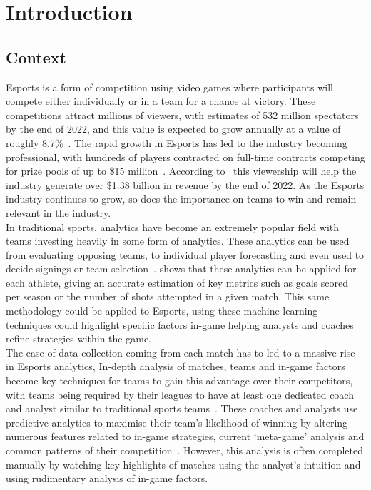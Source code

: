 \chapter{Introduction}\label{ch:introduction}

\section{Context}\label{sec:Context}

\ac{Esports} is a form of competition using video games where participants will compete either individually or in a team for a chance at victory.
These competitions attract millions of viewers, with estimates of 532 million spectators by the end of 2022, and this value is expected to grow annually at a value of roughly 8.7\%~\citep{newzoo2022viewers}.
The rapid growth in \ac{Esports} has led to the industry becoming professional, with hundreds of players contracted on full-time contracts competing for prize pools of up to \$15 million~\citep{esportsearnings}.
According to~\citet{newzoo2022viewers} this viewership will help the industry generate over \$1.38 billion in revenue by the end of 2022.
As the \ac{Esports} industry continues to grow, so does the importance on teams to win and remain relevant in the industry.\\

In traditional sports, analytics have become an extremely popular field with teams investing heavily in some form of analytics.
These analytics can be used from evaluating opposing teams, to individual player forecasting and even used to decide signings or team selection~\citep{sarlis2020sports, apostolou2019sports}.
\citet{apostolou2019sports, sarlis2020sports} shows that these analytics can be applied for each athlete, giving an accurate estimation of key metrics such as goals scored per season or the number of shots attempted in a given match.
This same methodology could be applied to \ac{Esports}, using these machine learning techniques could highlight specific factors in-game helping analysts and coaches refine strategies within the game.\\

The ease of data collection coming from each match has to led to a massive rise in \ac{Esports} analytics,
In-depth analysis of matches, teams and in-game factors become key techniques for teams to gain this advantage over their competitors, with teams being required by their leagues to have at least one dedicated coach and analyst similar to traditional sports teams~\citep{LCSRules}.
These coaches and analysts use predictive analytics to maximise their team's likelihood of winning by altering numerous features related to in-game strategies, current `meta-game' analysis and common patterns of their competition~\citep{kokkinakis2021metagaming}.
However, this analysis is often completed manually by watching key highlights of matches using the analyst's intuition and using rudimentary analysis of in-game factors.\\


